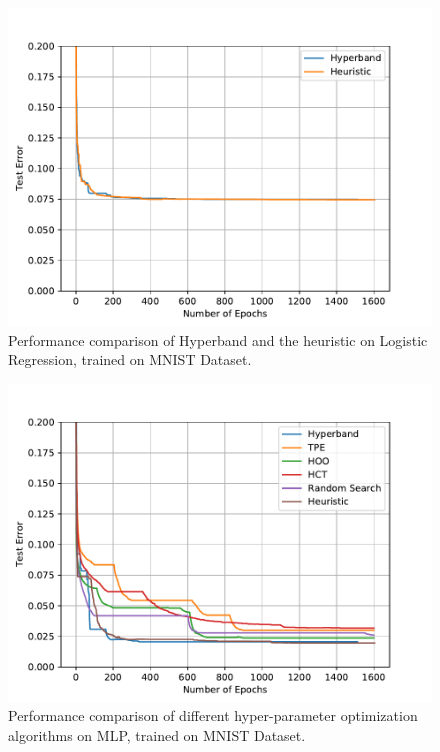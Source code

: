 \documentclass[runningheads,a4paper]{llncs}
\begin{document}
\begin{figure}[ht]
    \centering
    \includegraphics[scale=0.8]{img/mnist/logistic_1_bis.pdf}
    \caption{Performance comparison of Hyperband and the heuristic on Logistic Regression, trained on MNIST Dataset.}
    \label{logistic_1_bis}
\end{figure}

\begin{figure}[ht]
    \centering
    \includegraphics[scale=0.8]{img/mnist/mlp_0_bis.pdf}
    \caption{Performance comparison of different hyper-parameter optimization algorithms on MLP, trained on MNIST Dataset.}
    \label{mlp_0}
\end{figure}
\end{document}
